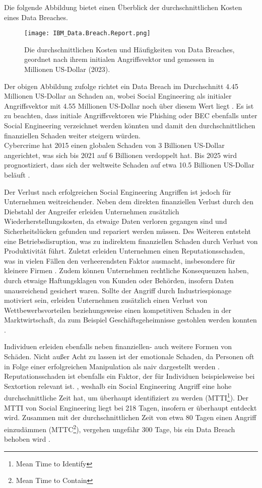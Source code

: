Die folgende Abbildung bietet einen Überblick der durchschnittlichen Kosten eines Data Breaches. 

\begin{figure}[!htp]
    \centering
    \texttt{[image: IBM\_Data.Breach.Report.png]}
    \caption{Die durchschnittlichen Kosten und Häufigkeiten von Data Breaches, geordnet nach ihrem initialen Angriffsvektor und gemessen in Millionen US-Dollar (2023).}
\end{figure}
\FloatBarrier

Der obigen Abbildung zufolge richtet ein Data Breach im Durchschnitt 4.45 Millionen US-Dollar an Schaden an, wobei Social Engineering als initialer Angriffsvektor mit 4.55 Millionen US-Dollar noch
über diesem Wert liegt .
Es ist zu beachten, dass initiale Angriffsvektoren wie Phishing oder BEC ebenfalls unter Social Engineering verzeichnet werden könnten und damit den durchschnittlichen finanziellen Schaden weiter steigern würden. \\
Cybercrime hat 2015 einen globalen Schaden von 3 Billionen US-Dollar angerichtet, was sich bis 2021 auf 6 Billionen verdoppelt hat.
Bis 2025 wird prognostiziert, dass sich der weltweite Schaden auf etwa 10.5 Billionen US-Dollar beläuft .

Der Verlust nach erfolgreichen Social Engineering Angriffen ist jedoch für Unternehmen weitreichender.
Neben dem direkten finanziellen Verlust durch den Diebstahl der Angreifer erleiden Unternehmen zusätzlich
Wiederherstellungskosten, da etwaige Daten verloren gegangen sind und Sicherheitslücken gefunden und repariert
werden müssen. Des Weiteren entsteht eine Betriebsdisruption, was zu indirektem finanziellen Schaden durch
Verlust von Produktivität führt. Zuletzt erleiden Unternehmen einen Reputationsschaden, was in vielen Fällen
den verheerendsten Faktor ausmacht, insbesondere für kleinere Firmen .
Zudem können Unternehmen rechtliche Konsequenzen haben, durch etwaige Haftungsklagen von Kunden oder Behörden, insofern Daten unausreichend gesichert waren.
Sollte der Angriff durch Industriespionage motiviert sein, erleiden Unternehmen zusätzlich einen Verlust von Wettbewerbsvorteilen beziehungsweise einen kompetitiven Schaden in der Marktwirtschaft, da zum Beispiel Geschäftsgeheimnisse gestohlen werden konnten .

Individuen erleiden ebenfalls neben finanziellen- auch weitere Formen von Schäden.
Nicht außer Acht zu lassen ist der emotionale Schaden, da Personen oft in Folge einer erfolgreichen Manipulation als naiv dargestellt werden .
Reputationsschaden ist ebenfalls ein Faktor, der für Individuen beispielsweise bei Sextortion relevant ist.
, weshalb ein Social Engineering Angriff eine hohe durchschnittliche Zeit hat, um überhaupt identifiziert zu werden (MTTI\footnote{Mean Time to Identify}).
Der MTTI von Social Engineering liegt bei 218 Tagen, insofern er überhaupt entdeckt wird. Zusammen mit der durchschnittlichen Zeit von etwa 80 Tagen einen Angriff einzudämmen (MTTC\footnote{Mean Time to Contain}), vergehen ungefähr 300 Tage, bis ein Data Breach behoben wird .
